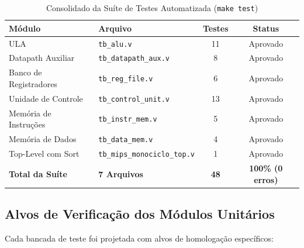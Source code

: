 \begin{table}[htbp]
\centering
\caption{Consolidado da Suíte de Testes Automatizada (\texttt{make test})}
\label{tab:testes_resumo}
\scriptsize
\setlength{\tabcolsep}{2.5pt}
\begin{tabular}{llcc}
\toprule
\textbf{Módulo} & \textbf{Arquivo} & \textbf{Testes} & \textbf{Status} \\
\midrule
ULA & \texttt{tb\_alu.v} & 11 & Aprovado \\
Datapath Auxiliar & \texttt{tb\_datapath\_aux.v} & 8 & Aprovado \\
Banco de Registradores & \texttt{tb\_reg\_file.v} & 6 & Aprovado \\
Unidade de Controle & \texttt{tb\_control\_unit.v} & 13 & Aprovado \\
Memória de Instruções & \texttt{tb\_instr\_mem.v} & 5 & Aprovado \\
Memória de Dados & \texttt{tb\_data\_mem.v} & 4 & Aprovado \\
Top-Level com Sort & \texttt{tb\_mips\_monociclo\_top.v} & 1 & Aprovado \\
\midrule
\textbf{Total da Suíte} & \textbf{7 Arquivos} & \textbf{48} & \textbf{100\% (0 erros)} \\
\bottomrule
\end{tabular}
\end{table}

\subsection{Alvos de Verificação dos Módulos Unitários}
Cada bancada de teste foi projetada com alvos de homologação específicos:

